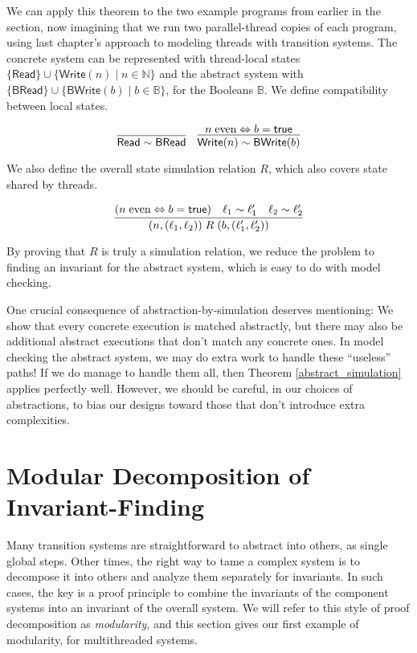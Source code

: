 \documentclass{amsbook}
\theoremstyle{definition}
\theoremstyle{remark}
\numberwithin{section}{chapter}
\numberwithin{equation}{chapter}
\begin{document}
We can apply this theorem to the two example programs from earlier in the section, now imagining that we run two parallel-thread copies of each program, using last chapter's approach to modeling threads with transition systems.
The concrete system can be represented with thread-local states $\{\mathsf{Read}\} \cup \{\mathsf{Write}(n) \mid n \in \mathbb N\}$ and the abstract system with $\{\mathsf{BRead}\} \cup \{\mathsf{BWrite}(b) \mid b \in \mathbb B\}$, for the Booleans $\mathbb B$.
We define compatibility between local states.

$$\infer{\mathsf{Read} \sim \mathsf{BRead}}{}
\quad \infer{\mathsf{Write}(n) \sim \mathsf{BWrite}(b)}{
  n \; \textrm{even} \Leftrightarrow b = \mathsf{true}
}$$

We also define the overall state simulation relation $R$, which also covers state shared by threads.

$$\infer{(n, (\ell_1, \ell_2)) \; R \; (b, (\ell'_1, \ell'_2))}{
  (n \; \textrm{even} \Leftrightarrow b = \mathsf{true})
  & \ell_1 \sim \ell'_1
  & \ell_2 \sim \ell'_2
}$$

By proving that $R$ is truly a simulation relation, we reduce the problem to finding an invariant for the abstract system, which is easy to do with model checking.

One crucial consequence of abstraction-by-simulation deserves mentioning:
We show that every concrete execution is matched abstractly, but there may also be additional abstract executions that don't match any concrete ones.
In model checking the abstract system, we may do extra work to handle these ``useless'' paths!
If we do manage to handle them all, then Theorem \ref{abstract_simulation} applies perfectly well.
However, we should be careful, in our choices of abstractions, to bias our designs toward those that don't introduce extra complexities.


\section{Modular Decomposition of Invariant-Finding}

Many transition systems are straightforward to abstract into others, as single global steps.
Other times, the right way to tame a complex system is to decompose it into others and analyze them separately for invariants.
In such cases, the key is a proof principle to combine the invariants of the component systems into an invariant of the overall system.
We will refer to this style of proof decomposition as \emph{modularity}, and this section gives our first example of modularity, for multithreaded systems.
\end{document}
